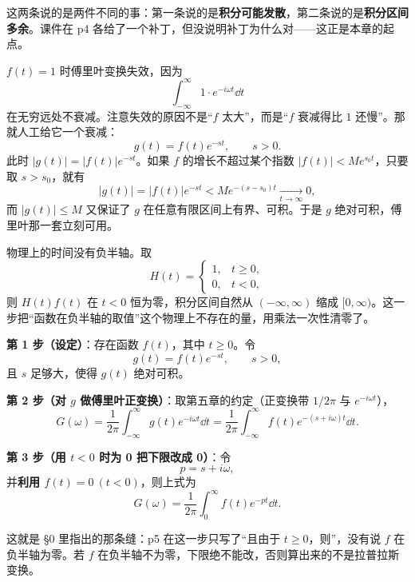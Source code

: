 \documentclass[11pt]{ctexart}
\begin{document}
这两条说的是两件不同的事：第一条说的是\textbf{积分可能发散}，第二条说的是\textbf{积分区间多余}。课件在 p4 各给了一个补丁，但没说明补丁为什么对——这正是本章的起点。


$f(t)=1$ 时傅里叶变换失效，因为
\[ \int_{-\infty}^{\infty}1\cdot e^{-i\omega t}\dd t \]
在无穷远处不衰减。注意失效的原因不是“$f$ 太大”，而是“$f$ 衰减得比 $1$ 还慢”。那就人工给它一个衰减：
\[ g(t)=f(t)e^{-st},\qquad s>0 .\]
此时 $|g(t)|=|f(t)|e^{-st}$。如果 $f$ 的增长不超过某个指数 $|f(t)|<Me^{s_0t}$，只要取 $s>s_0$，就有
\[ |g(t)|=|f(t)|e^{-st}<Me^{-(s-s_0)t}\xrightarrow[t\to\infty]{}0 ,\]
而 $|g(t)|\le M$ 又保证了 $g$ 在任意有限区间上有界、可积。于是 $g$ 绝对可积，傅里叶那一套立刻可用。



物理上的时间没有负半轴。取
\[
H(t)=\begin{cases}1, & t\ge 0,\\ 0, & t<0,\end{cases}
\]
则 $H(t)f(t)$ 在 $t<0$ 恒为零，积分区间自然从 $(-\infty,\infty)$ 缩成 $[0,\infty)$。这一步把“函数在负半轴的取值”这个物理上不存在的量，用乘法一次性清零了。


\textbf{第 1 步（设定）}：存在函数 $f(t)$，其中 $t\ge 0$。令
\[ g(t)=f(t)e^{-st},\qquad s>0, \]
且 $s$ 足够大，使得 $g(t)$ 绝对可积。

\textbf{第 2 步（对 $g$ 做傅里叶正变换）}：取第五章的约定（正变换带 $1/2\pi$ 与 $e^{-i\omega t}$），
\[ G(\omega)=\frac{1}{2\pi}\int_{-\infty}^{\infty}g(t)e^{-i\omega t}\dd t
=\frac{1}{2\pi}\int_{-\infty}^{\infty}f(t)e^{-(s+i\omega)t}\dd t .\]

\textbf{第 3 步（用 $t<0$ 时为 0 把下限改成 0）}：令
\[ p=s+i\omega ,\]
并\textbf{利用 $f(t)=0\ (t<0)$}，则上式为
\[ G(\omega)=\frac{1}{2\pi}\int_{0}^{\infty}f(t)e^{-pt}\dd t .\]

这就是 §0 里指出的那条缝：p5 在这一步只写了“且由于 $t\ge 0$，则”，没有说 $f$ 在负半轴为零。若 $f$ 在负半轴不为零，下限绝不能改，否则算出来的不是拉普拉斯变换。

\end{document}
